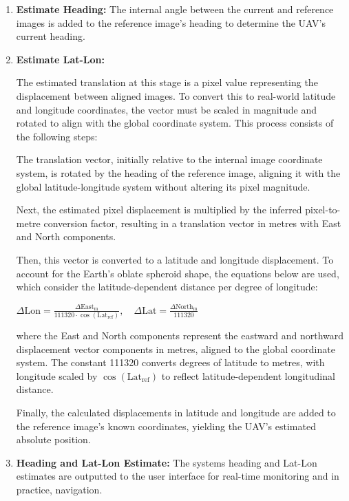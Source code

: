 \begin{enumerate}
    \item \textbf{Estimate Heading:}
    The internal angle between the current and reference images is added to the reference image's heading to determine the UAV's current heading. 
    \item \textbf{Estimate Lat-Lon:}  

    The estimated translation at this stage is a pixel value representing the displacement between aligned images. To convert this to real-world latitude and longitude coordinates, the vector must be scaled in magnitude and rotated to align with the global coordinate system. This process consists of the following steps:

    The translation vector, initially relative to the internal image coordinate system, is rotated by the heading of the reference image, aligning it with the global latitude-longitude system without altering its pixel magnitude.  

    Next, the estimated pixel displacement is multiplied by the inferred pixel-to-metre conversion factor, resulting in a translation vector in metres with East and North components. 

    Then, this vector is converted to a latitude and longitude displacement. To account for the Earth's oblate spheroid shape, the equations below are used, which consider the latitude-dependent distance per degree of longitude:  
    
    $ \Delta \text{Lon} = \frac{\Delta \text{East}_{\text{m}}}{111320 \cdot \cos(\text{Lat}_{\text{ref}})}, \quad \Delta \text{Lat} = \frac{\Delta \text{North}_{\text{m}}}{111320} $

    where the East and North components represent the eastward and northward displacement vector components in metres, aligned to the global coordinate system. The constant 111320 converts degrees of latitude to metres, with longitude scaled by $\cos(\text{Lat}_{\text{ref}})$ to reflect latitude-dependent longitudinal distance. 

    Finally, the calculated displacements in latitude and longitude are added to the reference image’s known coordinates, yielding the UAV’s estimated absolute position.  

    \item \textbf{Heading and Lat-Lon Estimate:}
    The systems heading and Lat-Lon estimates are outputted to the user interface for real-time monitoring and in practice, navigation.


\end{enumerate}


